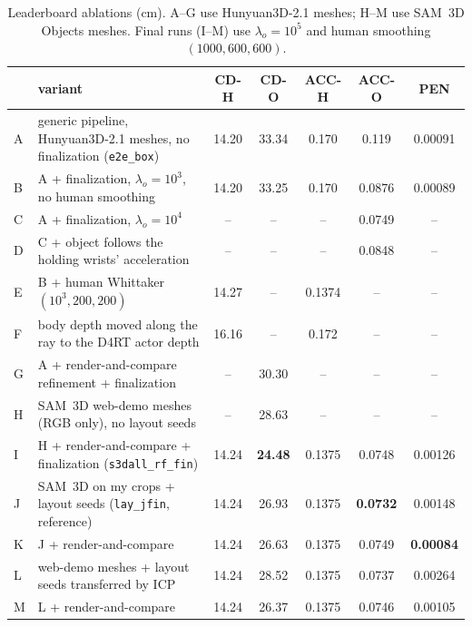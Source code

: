 \documentclass[10pt,twocolumn]{article}
\begin{document}
\begin{table}[t]
\centering\small
\setlength{\tabcolsep}{5pt}
\begin{tabular}{llccccc}
\toprule
& variant & CD-H & CD-O & ACC-H & ACC-O & PEN \\
\midrule
A & generic pipeline, Hunyuan3D-2.1 meshes, no finalization (\texttt{e2e\_box}) & 14.20 & 33.34 & 0.170 & 0.119 & 0.00091 \\
B & A + finalization, $\lambda_o = 10^3$, no human smoothing & 14.20 & 33.25 & 0.170 & 0.0876 & 0.00089 \\
C & A + finalization, $\lambda_o = 10^4$ & -- & -- & -- & 0.0749 & -- \\
D & C + object follows the holding wrists' acceleration & -- & -- & -- & 0.0848 & -- \\
E & B + human Whittaker $(10^3, 200, 200)$ & 14.27 & -- & 0.1374 & -- & -- \\
F & body depth moved along the ray to the D4RT actor depth & 16.16 & -- & 0.172 & -- & -- \\
G & A + render-and-compare refinement + finalization & -- & 30.30 & -- & -- & -- \\
\midrule
H & SAM~3D web-demo meshes (RGB only), no layout seeds & -- & 28.63 & -- & -- & -- \\
I & H + render-and-compare + finalization (\texttt{s3dall\_rf\_fin}) & 14.24 & \textbf{24.48} & 0.1375 & 0.0748 & 0.00126 \\
J & SAM~3D on my crops + layout seeds (\texttt{lay\_jfin}, reference) & 14.24 & 26.93 & 0.1375 & \textbf{0.0732} & 0.00148 \\
K & J + render-and-compare & 14.24 & 26.63 & 0.1375 & 0.0749 & \textbf{0.00084} \\
L & web-demo meshes + layout seeds transferred by ICP & 14.24 & 28.52 & 0.1375 & 0.0737 & 0.00264 \\
M & L + render-and-compare & 14.24 & 26.37 & 0.1375 & 0.0746 & 0.00105 \\
\bottomrule
\end{tabular}
\caption{Leaderboard ablations (cm). A--G use Hunyuan3D-2.1 meshes; H--M use SAM~3D Objects meshes. Final runs
(I--M) use $\lambda_o = 10^5$ and human smoothing $(1000, 600, 600)$.}
\label{tab:abl}
\end{table}
\end{document}
